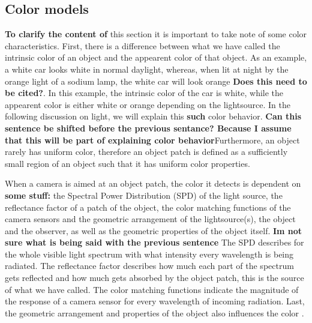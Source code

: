 \documentclass[a4paper,11pt]{article}
\begin{document}

\subsection{Color models}

\textbf{To clarify the content of} this section it is important to take note of some color characteristics. First, there is a difference between what we have called the intrinsic color of an object and the appearent color of that object. As an example, a white car looks white in normal daylight, whereas, when lit at night by the orange light of a sodium lamp, the white car will look orange \textbf{Does this need to be cited?}. In this example, the intrinsic color of the car is white, while the appearent color is either white or orange depending on the lightsource. In the following discussion on light, we will explain this \textbf{such} color behavior. \textbf{Can this sentence be shifted before the previous sentance? Because I assume that this will be part of explaining color behavior}Furthermore, an object rarely has uniform color, therefore an object patch is defined as a sufficiently small region of an object such that it has uniform color properties.

When a camera is aimed at an object patch, the color it detects is dependent on \textbf{some stuff:} the Spectral Power Distribution (SPD) of the light source, the reflectance factor of a patch of the object, the color matching functions of the camera sensors and the geometric arrangement of the lightsource(s), the object and the observer, as well as the geometric properties of the object itself. \textbf{Im not sure what is being said with the previous sentence} The SPD describes for the whole visible light spectrum with what intensity every wavelength is being radiated. The reflectance factor describes how much each part of the spectrum gets reflected and how much gets absorbed by the object patch, this is the source of what we have called. The color matching functions indicate the magnitude of the response of a camera sensor for every wavelength of incoming radiation. Last, the geometric arrangement and properties of the object also influences the color \cite{gevers_color}.
\end{document}
